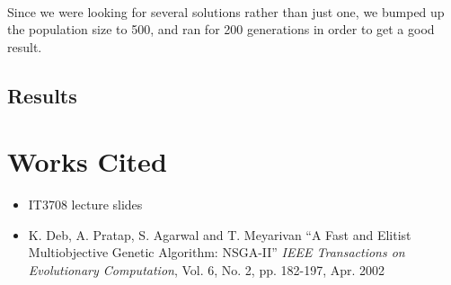 \documentclass[a4paper,12pt]{article}
\begin{document}
\paragraph{}Since we were looking for several solutions rather than just one, we bumped up the population size to 500, and ran for 200 generations in order to get a good result.

\subsection{Results}
\paragraph{}

\section{Works Cited}
\begin{itemize}
\item{IT3708 lecture slides}
\item{K. Deb, A. Pratap, S. Agarwal and T. Meyarivan ``A Fast and Elitist Multiobjective Genetic Algorithm: NSGA-II'' \textit{IEEE Transactions on Evolutionary Computation}, Vol. 6, No. 2, pp. 182-197, Apr. 2002}
\end{itemize}
\end{document}
